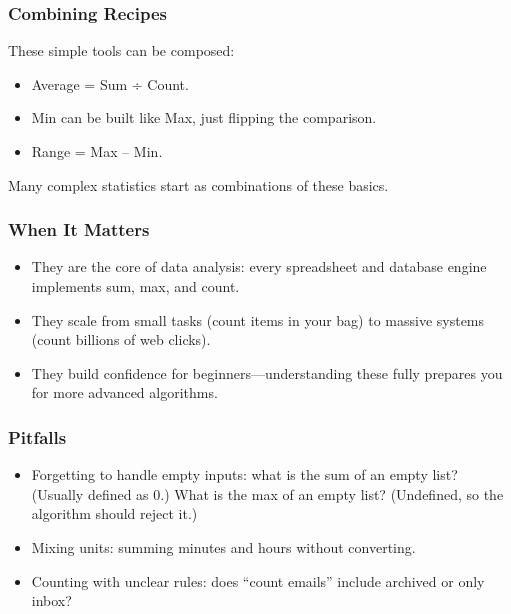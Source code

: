 \documentclass[
  letterpaper,
  DIV=11,
  numbers=noendperiod]{scrreprt}
\providecommand{\tightlist}{%
  \setlength{\itemsep}{0pt}\setlength{\parskip}{0pt}}
\begin{document}
\subsubsection{Combining Recipes}\label{combining-recipes}

These simple tools can be composed:

\begin{itemize}
\tightlist
\item
  Average = Sum ÷ Count.
\item
  Min can be built like Max, just flipping the comparison.
\item
  Range = Max -- Min.
\end{itemize}

Many complex statistics start as combinations of these basics.

\subsubsection{When It Matters}\label{when-it-matters-7}

\begin{itemize}
\tightlist
\item
  They are the core of data analysis: every spreadsheet and database
  engine implements sum, max, and count.
\item
  They scale from small tasks (count items in your bag) to massive
  systems (count billions of web clicks).
\item
  They build confidence for beginners---understanding these fully
  prepares you for more advanced algorithms.
\end{itemize}

\subsubsection{Pitfalls}\label{pitfalls-6}

\begin{itemize}
\tightlist
\item
  Forgetting to handle empty inputs: what is the sum of an empty list?
  (Usually defined as 0.) What is the max of an empty list? (Undefined,
  so the algorithm should reject it.)
\item
  Mixing units: summing minutes and hours without converting.
\item
  Counting with unclear rules: does ``count emails'' include archived or
  only inbox?
\end{itemize}
\end{document}
